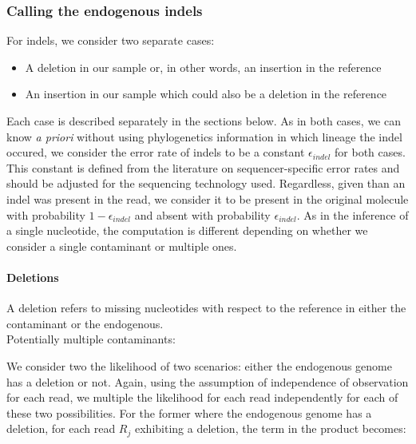 \documentclass[a4paper,12pt]{article}
\begin{document}
\begin{itemize}
\begin{itemize}
\subsubsection{Calling the endogenous indels}

For indels, we consider two separate cases:

\begin{itemize}
\item A deletion in our sample or, in other words, an insertion in the reference 
\item An insertion in our sample which could also be a deletion in the reference
\end{itemize}

\noindent Each case is described separately in the sections below. As in both cases, we can know {\it a priori} without using phylogenetics information in which lineage the indel occured, we consider the error rate of indels to be a constant $\epsilon_{indel}$ for both cases. This constant is defined from the literature on sequencer-specific error rates\cite{minoche2011evaluation} and should be adjusted for the sequencing technology used. Regardless, given than an indel was present in the read, we consider it to be present in the original molecule with probability $1-\epsilon_{indel}$ and absent with probability $\epsilon_{indel}$. As in the inference of a single nucleotide, the computation is different depending on whether we consider a single contaminant or multiple ones.

\noindent \paragraph{Deletions}

A deletion refers to missing nucleotides with respect to the reference in either the contaminant or the endogenous. \\


\noindent  Potentially multiple contaminants:

We consider two the likelihood of two scenarios: either the endogenous genome has a deletion or not. Again, using the assumption of independence of observation for each read, we multiple the likelihood for each read independently for each of these two possibilities. For the former where the endogenous genome has a deletion, for each read $R_j$ exhibiting a deletion, the term in the product becomes:


\end{itemize}
\end{itemize}
\end{document}
